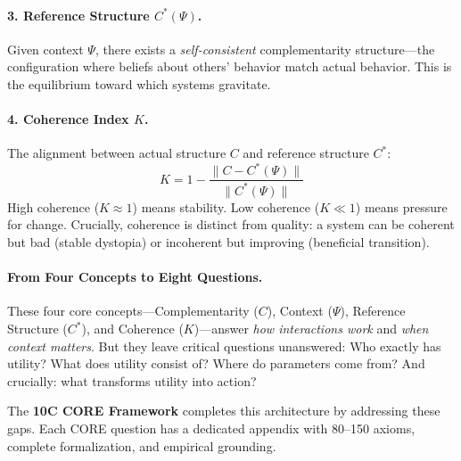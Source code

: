 \paragraph{3. Reference Structure $C^*(\Psi)$.}
Given context $\Psi$, there exists a \emph{self-consistent} complementarity structure---the configuration where beliefs about others' behavior match actual behavior. This is the equilibrium toward which systems gravitate.

\paragraph{4. Coherence Index $K$.}
The alignment between actual structure $C$ and reference structure $C^*$:
\begin{equation}
    K = 1 - \frac{\|C - C^*(\Psi)\|}{\|C^*(\Psi)\|}
\end{equation}
High coherence ($K \approx 1$) means stability. Low coherence ($K \ll 1$) means pressure for change. Crucially, coherence is distinct from quality: a system can be coherent but bad (stable dystopia) or incoherent but improving (beneficial transition).

\paragraph{From Four Concepts to Eight Questions.}
\label{sec:intro-9c}
These four core concepts---Complementarity ($C$), Context ($\Psi$), Reference Structure ($C^*$), and Coherence ($K$)---answer \emph{how interactions work} and \emph{when context matters}. But they leave critical questions unanswered: Who exactly has utility? What does utility consist of? Where do parameters come from? And crucially: what transforms utility into action?

The \textbf{10C CORE Framework} completes this architecture by addressing these gaps. Each CORE question has a dedicated appendix with 80--150 axioms, complete formalization, and empirical grounding.


